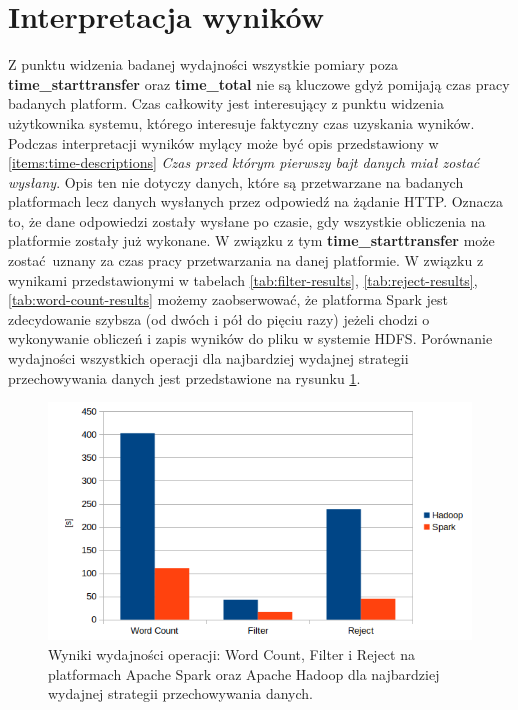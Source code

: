 \section{Interpretacja wyników}
Z punktu widzenia badanej wydajności wszystkie pomiary poza \textbf{time\_starttransfer} oraz \textbf{time\_total} nie są kluczowe gdyż pomijają czas pracy badanych platform. Czas całkowity jest interesujący z punktu widzenia użytkownika systemu, którego interesuje faktyczny czas uzyskania wyników. Podczas interpretacji wyników mylący może być opis przedstawiony w \ref{items:time-descriptions} \textit{Czas przed którym pierwszy bajt danych miał zostać wysłany}. Opis ten nie dotyczy danych, które są przetwarzane na badanych platformach lecz danych wysłanych przez odpowiedź na żądanie HTTP. Oznacza to, że dane odpowiedzi zostały wysłane po czasie, gdy wszystkie obliczenia na platformie zostały już wykonane. W związku z tym \textbf{time\_starttransfer} może zostać uznany za czas pracy przetwarzania na danej platformie.
\newline W związku z wynikami przedstawionymi w tabelach \ref{tab:filter-results}, \ref{tab:reject-results}, \ref{tab:word-count-results} możemy zaobserwować, że platforma Spark jest zdecydowanie szybsza (od dwóch i pół do pięciu razy) jeżeli chodzi o wykonywanie obliczeń i zapis wyników do pliku w systemie HDFS. Porównanie wydajności wszystkich operacji dla najbardziej wydajnej strategii przechowywania danych jest przedstawione na rysunku \ref{fig:results-comparison-bar}.
\begin{figure}[!htb]
	\centering
	\includegraphics[scale=0.6]{results-comparison-bar.png}
	\caption{Wyniki wydajności operacji: Word Count, Filter i Reject na platformach Apache Spark oraz Apache Hadoop dla najbardziej wydajnej strategii przechowywania danych.}
	\label{fig:results-comparison-bar}
\end{figure}
